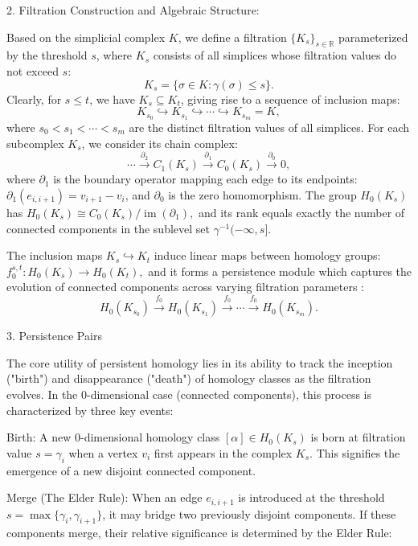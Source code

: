 \documentclass{ws-mplb}
\begin{document}

2.  Filtration Construction and Algebraic Structure:

Based on the simplicial complex $K$, we define a filtration $\{K_s\}_{s \in \mathbb{R}}$ parameterized by the threshold $s$, where $K_s$ consists of all simplices whose filtration values do not exceed $s$:
$$K_s= \{\sigma \in K : \gamma (\sigma) \le s\}.$$
Clearly, for $s \le t$, we have $K_s \subseteq K_t$, giving rise to a sequence of inclusion maps:
$$K_{s_0} \hookrightarrow K_{s_1} \hookrightarrow \cdots \hookrightarrow K_{s_m} = K,$$
where $s_0 < s_1 < \cdots < s_m$ are the distinct filtration values of all simplices.
For each subcomplex $K_s$, we consider its chain complex:
$$\cdots \xrightarrow{\partial_2} C_1(K_s) \xrightarrow{\partial_1} C_0(K_s) \xrightarrow{\partial_0} 0,$$
where $\partial_1$ is the boundary operator mapping each edge to its endpoints: $\partial_1(e_{i,i+1}) = v_{i+1} - v_i$, and $\partial_0$ is the zero homomorphism.
The group $H_0(K_s)$ has $H_0(K_s) \cong C_0(K_s) / \operatorname{im}(\partial_1),$
and its rank equals exactly the number of connected components in the sublevel set $\gamma^{-1}(-\infty, s]$.

The inclusion maps $K_s \hookrightarrow K_t$ induce linear maps between homology groups: $f^{s,t}_0: H_0(K_s) \to H_0(K_t),$
and it forms a persistence module which captures the evolution of connected components across varying filtration parameters :
$$H_0(K_{s_0}) \xrightarrow{f_0} H_0(K_{s_1}) \xrightarrow{f_0} \cdots \xrightarrow{f_0} H_0(K_{s_m}).$$

3. Persistence Pairs

The core utility of persistent homology lies in its ability to track the inception ("birth") and disappearance ("death") of homology classes as the filtration evolves. In the 0-dimensional case (connected components), this process is characterized by three key events:

Birth: A new 0-dimensional homology class $[\alpha] \in H_0(K_s)$ is born at filtration value $s = \gamma_i$ when a vertex $v_i$ first appears in the complex $K_s$. This signifies the emergence of a new disjoint connected component.

Merge (The Elder Rule): When an edge $e_{i,i+1}$ is introduced at the threshold $s = \max\{\gamma_i, \gamma_{i+1}\}$, it may bridge two previously disjoint components. If these components merge, their relative significance is determined by the Elder Rule:
\end{document}
